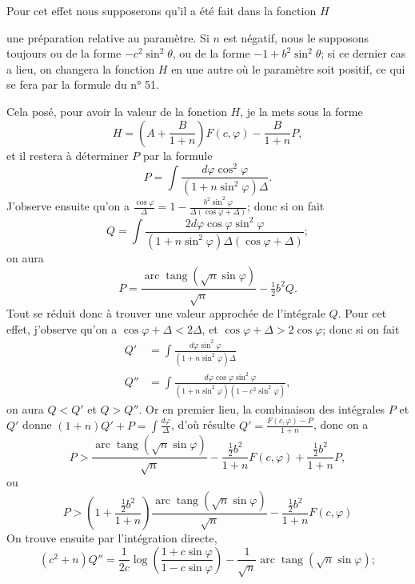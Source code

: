 \documentclass{article}
\begin{document}
Pour cet effet nous supposerons qu'il a été fait dans la fonction $H$

une préparation relative au paramètre. Si $n$ est négatif, nous le supposons toujours ou de la forme $-c^{2}\sin^{2}\theta$, ou de la forme $-1+b^{2}\sin^{2}\theta$; si ce dernier cas a lieu, on changera la fonction $H$ en une autre où le paramètre soit positif, ce qui se fera par la formule du n° 51.

Cela posé, pour avoir la valeur de la fonction $H$, je la mets sous la forme
\[ H=\left(A+\frac{B}{1+n}\right)F(c,\varphi)-\frac{B}{1+n}P, \]
et il restera à déterminer $P$ par la formule
\[ P=\int\frac{d\varphi\cos^{2}\varphi}{(1+n\sin^{2}\varphi)\Delta}. \]
J'observe ensuite qu'on a $\frac{\cos\varphi}{\Delta}=1-\frac{b^{2}\sin^{2}\varphi}{\Delta(\cos\varphi+\Delta)}$; donc si on fait
\[ Q=\int\frac{2d\varphi\cos\varphi\sin^{2}\varphi}{(1+n\sin^{2}\varphi)\Delta(\cos\varphi+\Delta)}; \]
on aura
\[ P=\frac{\operatorname{arc}\operatorname{tang}(\sqrt{n}\sin\varphi)}{\sqrt{n}}-\tfrac{1}{2}b^{2}Q. \]
Tout se réduit donc à trouver une valeur approchée de l'intégrale $Q$. Pour cet effet, j'observe qu'on a $\cos\varphi+\Delta<2\Delta$, et $\cos\varphi+\Delta>2\cos\varphi$; donc si on fait
\[ \begin{aligned} Q'&=\int\frac{d\varphi\sin^{2}\varphi}{(1+n\sin^{2}\varphi)\Delta}\\ Q''&=\int\frac{d\varphi\cos\varphi\sin^{2}\varphi}{(1+n\sin^{2}\varphi)(1-c^{2}\sin^{2}\varphi)}, \end{aligned} \]
on aura $Q<Q'$ et $Q>Q''$. Or en premier lieu, la combinaison des intégrales $P$ et $Q'$ donne $(1+n)Q'+P=\displaystyle\int\frac{d\varphi}{\Delta}$, d'où résulte $Q'=\frac{F(c,\varphi)-P}{1+n}$, donc on a
\[ P>\frac{\operatorname{arc}\operatorname{tang}(\sqrt{n}\sin\varphi)}{\sqrt{n}}-\frac{\tfrac{1}{2}b^{2}}{1+n}F(c,\varphi)+\frac{\tfrac{1}{2}b^{2}}{1+n}P, \]
ou
\[ P>\left(1+\frac{\tfrac{1}{2}b^{2}}{1+n}\right)\frac{\operatorname{arc}\operatorname{tang}(\sqrt{n}\sin\varphi)}{\sqrt{n}}-\frac{\tfrac{1}{2}b^{2}}{1+n}F(c,\varphi) \]
On trouve ensuite par l'intégration directe,
\[ (c^{2}+n)Q''=\frac{1}{2c}\log\left(\frac{1+c\sin\varphi}{1-c\sin\varphi}\right)-\frac{1}{\sqrt{n}}\operatorname{arc}\operatorname{tang}(\sqrt{n}\sin\varphi); \]
\end{document}
